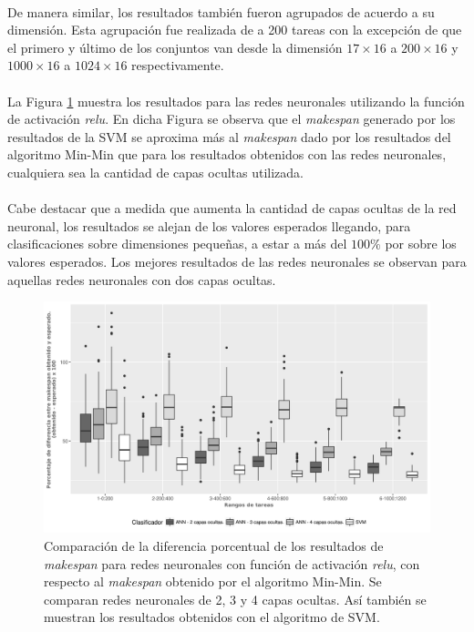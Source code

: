 \paragraph{} De manera similar, los resultados también fueron agrupados de acuerdo a su dimensión. Esta agrupación fue realizada de a 200 tareas con la excepción de que el primero y último de los conjuntos van desde la dimensión $17\times16$ a $200\times16$ y $1000\times16$ a $1024\times16$ respectivamente.

\paragraph{}La Figura \ref{fig:relu234} muestra los resultados para las redes neuronales utilizando la función de activación \textit{relu}. En dicha Figura se observa que el \textit{makespan} generado por los resultados de la SVM se aproxima más al \textit{makespan} dado por los resultados del algoritmo Min-Min que para los resultados obtenidos con las redes neuronales, cualquiera sea la cantidad de capas ocultas utilizada. 

\paragraph{} Cabe destacar que a medida que aumenta la cantidad de capas ocultas de la red neuronal, los resultados se alejan de los valores esperados llegando, para clasificaciones sobre dimensiones pequeñas, a estar a más del $100\%$ por sobre los valores esperados. Los mejores resultados de las redes neuronales se observan para aquellas redes neuronales con dos capas ocultas. %


\begin{figure}[H]
  \centering
  \includegraphics[width=\columnwidth]{imagenes/comparacion_anns_relu.png}
  \caption{Comparación de  la diferencia porcentual  de los resultados de \textit{makespan} para redes neuronales con función de activación \textit{relu}, con respecto al \textit{makespan} obtenido por el algoritmo Min-Min. Se comparan redes neuronales de 2, 3 y 4 capas ocultas. Así también se muestran los resultados obtenidos con el algoritmo de SVM.}
  \label{fig:relu234}
\end{figure}

